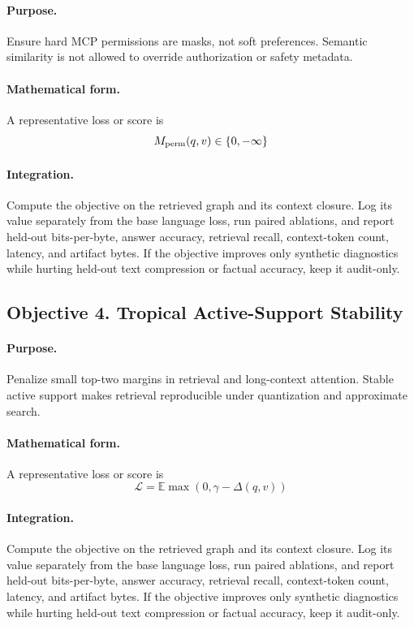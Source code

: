 \documentclass[11pt]{article}
\theoremstyle{definition}
\theoremstyle{remark}
\begin{document}
\paragraph{Purpose.} Ensure hard MCP permissions are masks, not soft preferences. Semantic similarity is not allowed to override authorization or safety metadata.

\paragraph{Mathematical form.} A representative loss or score is
\[
    M_{\rm perm}(q,v)\in\{0,-\infty\}
\]

\paragraph{Integration.} Compute the objective on the retrieved graph and its context closure. Log its value separately from the base language loss, run paired ablations, and report held-out bits-per-byte, answer accuracy, retrieval recall, context-token count, latency, and artifact bytes. If the objective improves only synthetic diagnostics while hurting held-out text compression or factual accuracy, keep it audit-only.


\subsection{Objective 4. Tropical Active-Support Stability}
\paragraph{Purpose.} Penalize small top-two margins in retrieval and long-context attention. Stable active support makes retrieval reproducible under quantization and approximate search.

\paragraph{Mathematical form.} A representative loss or score is
\[
    \mathcal L=\mathbb E\max(0,\gamma-\Delta(q,v))
\]

\paragraph{Integration.} Compute the objective on the retrieved graph and its context closure. Log its value separately from the base language loss, run paired ablations, and report held-out bits-per-byte, answer accuracy, retrieval recall, context-token count, latency, and artifact bytes. If the objective improves only synthetic diagnostics while hurting held-out text compression or factual accuracy, keep it audit-only.
\end{document}
